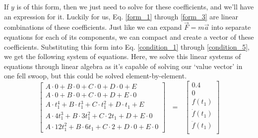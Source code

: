\documentclass[nofoot,pdf-a,balance,colorlinks,upint,subscriptcorrection,varvw,mathalfa=cal=boondoxo]{asmeconf}
\begin{document}
    If $y$ is of this form, then we just need to solve for these coefficients, and we'll have an expression for it. Luckily for us, Eq. \eqref{form_1} through \eqref{form_3} are linear combinations of these coefficients. Just like we can expand $\vec{F} = m \vec{a}$ into separate equations for each of its components, we can compact and create a vector of these coefficients. Substituting this form into Eq. \eqref{condition_1} through \eqref{condition_5}, we get the following system of equations. Here, we solve this linear systems of equations through linear algebra as it's capable of solving our `value vector' in one fell swoop, but this could be solved element-by-element.
    \begin{equation}
        \begin{bmatrix}
            A \cdot 0 + B\cdot 0 + C\cdot 0 + D\cdot 0 + E \\
            A \cdot 0 + B\cdot 0 + C \cdot 0 + D + E \cdot 0 \\
            A \cdot  t_1^4 + B\cdot  t_1^3 + C\cdot  t_1^2 + D\cdot  t_1 + E \\
            A \cdot  4t_1^3 + B\cdot  3t_1^2 + C \cdot  2t_1 + D + E \cdot  0 \\
            A\cdot 12t_1^2 + B\cdot  6t_1 + C \cdot  2 + D\cdot 0 + E\cdot  0
        \end{bmatrix} \textrm{ } = \textrm{ }  
        \begin{bmatrix}
            0.4 \\ 
            0 \\
            f\left(t_1\right) \\
            \dot{f}\left(t_1\right) \\
            \ddot{f}\left(t_1\right) \\
        \end{bmatrix}
    \end{equation}
\end{document}
